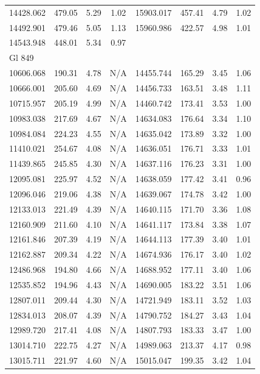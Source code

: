 {\begin{longtable}{l|ccc||l|ccc}
14428.062 & 479.05 & 5.29 & 1.02 & 15903.017 & 457.41 & 4.79 & 1.02 \\  
14492.901 & 479.46 & 5.05 & 1.13 & 15960.986 & 422.57 & 4.98 & 1.01 \\  
14543.948 & 448.01 & 5.34 & 0.97 &  &  &  &  \\  
\hline
Gl 849 & & & & & & & \\ 
10606.068 & 190.31 & 4.78 & N/A & 14455.744 & 165.29 & 3.45 & 1.06 \\  
10666.001 & 205.60 & 4.69 & N/A & 14456.733 & 163.51 & 3.48 & 1.11 \\  
10715.957 & 205.19 & 4.99 & N/A & 14460.742 & 173.41 & 3.53 & 1.00 \\  
10983.038 & 217.69 & 4.67 & N/A & 14634.083 & 176.64 & 3.34 & 1.10 \\  
10984.084 & 224.23 & 4.55 & N/A & 14635.042 & 173.89 & 3.32 & 1.00 \\  
11410.021 & 254.67 & 4.08 & N/A & 14636.051 & 176.71 & 3.33 & 1.01 \\  
11439.865 & 245.85 & 4.30 & N/A & 14637.116 & 176.23 & 3.31 & 1.00 \\  
12095.081 & 225.97 & 4.52 & N/A & 14638.059 & 177.42 & 3.41 & 0.96 \\  
12096.046 & 219.06 & 4.38 & N/A & 14639.067 & 174.78 & 3.42 & 1.00 \\  
12133.013 & 221.49 & 4.39 & N/A & 14640.115 & 171.70 & 3.36 & 1.08 \\  
12160.909 & 211.60 & 4.10 & N/A & 14641.117 & 173.84 & 3.38 & 1.07 \\  
12161.846 & 207.39 & 4.19 & N/A & 14644.113 & 177.39 & 3.40 & 1.01 \\  
12162.887 & 209.34 & 4.22 & N/A & 14674.936 & 176.17 & 3.40 & 1.02 \\  
12486.968 & 194.80 & 4.66 & N/A & 14688.952 & 177.11 & 3.40 & 1.06 \\  
12535.852 & 194.96 & 4.43 & N/A & 14690.005 & 183.22 & 3.51 & 1.06 \\  
12807.011 & 209.44 & 4.30 & N/A & 14721.949 & 183.11 & 3.52 & 1.03 \\  
12834.013 & 208.07 & 4.39 & N/A & 14790.752 & 184.27 & 3.43 & 1.04 \\  
12989.720 & 217.41 & 4.08 & N/A & 14807.793 & 183.33 & 3.47 & 1.00 \\  
13014.710 & 222.75 & 4.27 & N/A & 14989.063 & 213.37 & 4.17 & 0.98 \\  
13015.711 & 221.97 & 4.60 & N/A & 15015.047 & 199.35 & 3.42 & 1.04 \\  

\end{longtable}}
